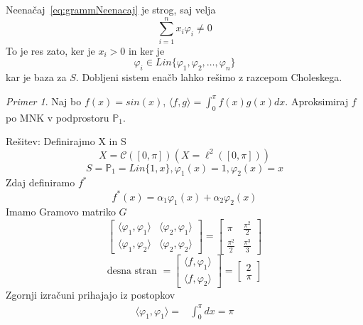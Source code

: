 \documentclass[a4paper,12pt]{article}
\newcommand{\innerproduct}[2]{\langle #1, #2 \rangle}
\theoremstyle{definition}
\theoremstyle{remark}
\newtheorem*{ex}{Primer}
\newcommand{\Pp}{\mathbb{P}}
\begin{document}
Neenačaj~\ref{eq:grammNeenacaj} je strog, saj velja
\begin{equation*}
    \sum_{i = 1}^{n} x_i \varphi_i \neq 0
\end{equation*}
To je res zato, ker je $x_i > 0$ in ker je
\begin{equation*}
    \varphi_i \in Lin\{\varphi_1, \varphi_2, \dots, \varphi_n\}
\end{equation*}
kar je baza za $S$. Dobljeni sistem enačb lahko rešimo z razcepom Choleskega.

\begin{ex}
    Naj bo $f(x) = sin (x)$, $\innerproduct{f}{g} = \int_{0}^{\pi} f(x) g(x) dx$. Aproksimiraj $f$ po MNK v podprostoru $\Pp_1$.

    Rešitev:
    Definirajmo X in S
    \[X = \mathscr{C} ([0, \pi]) (X = \ell^2 ([0, \pi]))\]
    \[S = \Pp_1 = Lin\{1, x\}, \varphi_1(x) = 1, \varphi_2 (x) = x\]
    Zdaj definiramo $f^*$
    \[f^*(x) = \alpha_1 \varphi_1(x) + \alpha_2 \varphi_2(x)\]
    Imamo Gramovo matriko $G$
    \begin{equation*}
        \begin{bmatrix}
            \innerproduct{\varphi_1}{\varphi_1} & \innerproduct{\varphi_2}{\varphi_1}\\
            \innerproduct{\varphi_1}{\varphi_2} & \innerproduct{\varphi_2}{\varphi_2}
        \end{bmatrix}
        =
        \begin{bmatrix}
            \pi & \frac{\pi^2}{2} \\
            \frac{\pi^2}{2} & \frac{\pi^3}{3}
        \end{bmatrix}
    \end{equation*}
    \begin{equation*}
        \text{desna stran } =
        \begin{bmatrix}
            \innerproduct{f}{\varphi_1} \\
            \innerproduct{f}{\varphi_2}
        \end{bmatrix}
        =
        \begin{bmatrix}
            2 \\
            \pi
        \end{bmatrix}
    \end{equation*}
    Zgornji izračuni prihajajo iz postopkov
    \begin{align*}
        \innerproduct{\varphi_1}{\varphi_1} =& \int_{0}^{\pi} dx = \pi \\

\end{align*}
\end{ex}
\end{document}
